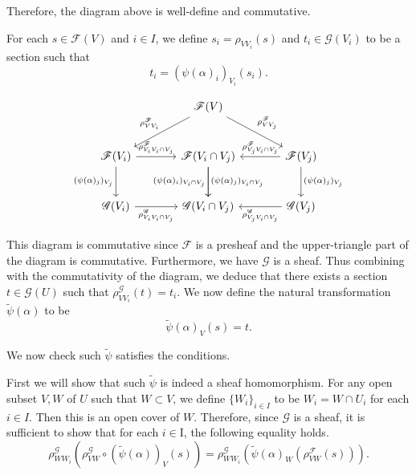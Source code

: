 \documentclass{article}
\begin{document}
Therefore, the diagram above is well-define and commutative. \\


\par For each $s\in\mathcal{F}(V)$ and $i\in I$, we define $s_i=\rho_{VV_i}(s)$ and $t_i\in\mathcal{G}(V_i)$ to be a section such that
\begin{equation*}
t_i = (\psi(\alpha)_i)_{V_i}(s_i).
\end{equation*}

\[ \begin{tikzcd}[row sep=large, column sep=large]
{}&\mathcal{F}(V)\arrow{ld}[swap]{\rho^{\mathcal{F}}_{VV_i}}\arrow{rd}{\rho^{\mathcal{F}}_{VV_j}}\\%
\mathcal{F}(V_i) \arrow{r}{\rho^{\mathcal{F}}_{V_iV_i\cap V_j}} \arrow[swap]{d}{(\psi(\alpha)_j)_{V_j}} & \mathcal{F}(V_i\cap V_j) \arrow{d}[swap]{(\psi(\alpha)_i)_{V_i\cap V_j}} \arrow{d}{(\psi(\alpha)_j)_{V_i\cap V_j}}&\arrow{l}[swap]{\rho^{\mathcal{F}}_{V_jV_i\cap V_j}} \mathcal{F}(V_j)\arrow{d}{(\psi(\alpha)_j)_{V_j}}\\%
\mathcal{G}(V_i) \arrow{r}[swap]{\rho^{\mathcal{G}}_{V_iV_i\cap V_j}} & \mathcal{G}(V_i\cap V_j)&\arrow{l}{\rho^{\mathcal{G}}_{V_jV_i\cap V_j}} \mathcal{G}(V_j)
\end{tikzcd}
\]

This diagram is commutative since $\mathcal{F}$ is a presheaf and the upper-triangle part of the diagram is commutative. Furthermore, we have $\mathcal{G}$ is a sheaf. Thus combining with the commutativity of the diagram, we deduce that there exists a section $t\in\mathcal{G}(U)$ such that $\rho^{\mathcal{G}}_{VV_i}(t)=t_i$. We now define the natural transformation $\tilde{\psi}(\alpha)$ to be
\begin{equation*}
\tilde{\psi}(\alpha)_V(s) = t.
\end{equation*}

We now check such $\tilde{\psi}$ satisfies the conditions.\\
\par First we will show that such $\tilde{\psi}$ is indeed a sheaf homomorphism. For any open subset $V,W$ of $U$ such that $W\subset V$, we define $\{W_i\}_{i\in I}$ to be $W_i=W\cap U_i$ for each $i\in I$. Then this is an open cover of $W$. Therefore, since $\mathcal{G}$ is a sheaf, it is sufficient to show that for each $i\in $I, the following equality holds.
\begin{equation*}
\rho^{\mathcal{G}}_{WW_i}(\rho^{\mathcal{G}}_{VW}\circ(\tilde{\psi}(\alpha))_V(s))=\rho^{\mathcal{G}}_{WW_i}(\tilde{\psi}(\alpha)_{W}(\rho^{\mathcal{F}}_{VW}(s))).
\end{equation*}
\end{document}
